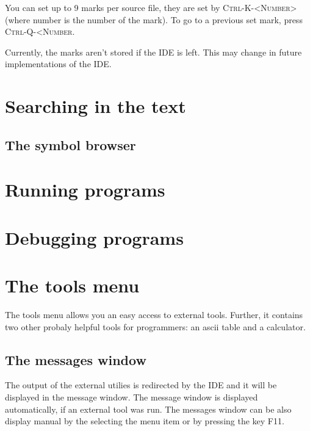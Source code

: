 You can set up to 9 marks per source file, they are set by
\textsc{Ctrl-K-<Number>} (where number is the number of the mark).
To go to a previous set mark, press \textsc{Ctrl-Q-<Number}.

\begin{remark}
Currently, the marks aren't stored if the IDE is left. This may
change in future implementations of the IDE.
\end{remark}

\section{Searching in the text}
\label{ide:searching}


\subsection{The symbol browser}

\section{Running programs}
\label{ide:running}

\section{Debugging programs}

\section{The tools menu}
\label{ide:toolsmenu}
The tools menu allows you an easy access to external tools. Further,
it contains two other probaly helpful tools for programmers: an
ascii table and a calculator.

\subsection{The messages window}
The output of the external utilies is redirected by the IDE and it
will be displayed in the message window. The message window is
displayed automatically, if an external tool was run. The
messages window can be also display manual by the selecting the
menu item  or by pressing the key \textsc{F11}.

